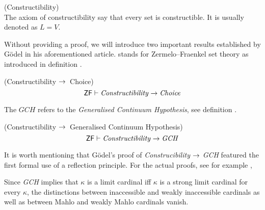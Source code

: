 \begin{definition}{(Constructibility)}\\
The axiom of constructibility say that every set is constructible. It is usually denoted as $L = V$.
\end{definition}

Without providing a proof, we will introduce two important results established by Gödel in his aforementioned article. 
 stands for Zermelo–Fraenkel set theory as introduced in definition .

\begin{theorem}{(Constructibility $\rightarrow$ Choice)}
\begin{equation}
\sf{ZF} \vdash \mbox{\emph{Constructibility}} \rightarrow \mbox{\emph{Choice}} 
\end{equation}
\end{theorem}

The $GCH$ refers to the \emph{Generalised Continuum Hypothesis}, see definition .
\begin{theorem}{(Constructibility $\rightarrow$ Generalised Continuum Hypothesis)}\label{theorem:l_then_gch}
\begin{equation}
\sf{ZF} \vdash \mbox{\emph{Constructibility}} \rightarrow \mbox{\emph{GCH}} 
\end{equation}
\end{theorem}
It is worth mentioning that Gödel's proof of \emph{Construcibility} $\rightarrow$ \emph{GCH} featured the first formal use of a reflection principle. 
For the actual proofs, see for example \cite{Kunen_independence},

Since \emph{GCH} implies that $\kappa$ is a limit cardinal iff $\kappa$ is a strong limit cardinal for every $\kappa$, the distinctions between inaccessible and weakly inaccessible cardinals as well as between Mahlo and weakly Mahlo cardinals vanish.



